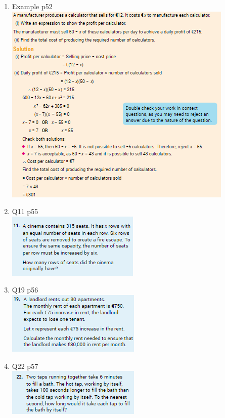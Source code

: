 \documentclass[a4paper,14pt]{extarticle}
\begin{document}
\begin{enumerate}
\begin{enumerate}
\item{Example p52}\\
\includegraphics[keepaspectratio=true, scale=1.4]{examplep52}\\
\vspace{10cm}
\item{Q11 p55}\\
\includegraphics[width=.7\linewidth]{q11p55}\\
\newpage
\item{Q19 p56}\\
\includegraphics[width=.7\linewidth]{q19p56}\\
\vspace{10cm}
\item{Q22 p57}\\
\includegraphics[width=.7\linewidth]{q22p57}\\
\newpage
\end{enumerate}


\vspace{10cm}
\end{enumerate}

 
\end{document}
